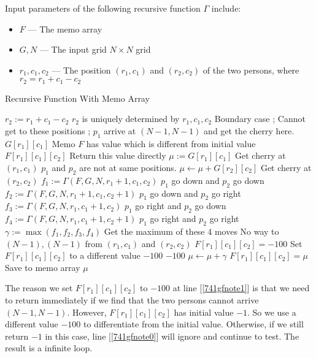 \documentclass[a4paper,12pt]{article}
\begin{document}
Input parameters of the following recursive function $\Gamma$ include:
\begin{itemize}
\item $F$ --- The memo array
\item $G, N$ --- The input grid $N\times N$ grid
\item $r_1, c_1, c_2$ --- The position $(r_1, c_1)$ and $(r_2, c_2)$ of the two persons, where $r_2 = r_1+c_1-c_2$
\end{itemize}
\begin{algorithm}[H]
\caption{Recursive Function With Memo Array}
\label{741gf}
\begin{algorithmic}[1]
\State $r_2 := r_1+c_1-c_2$ \Comment $r_2$ is uniquely determined by $r_1,c_1,c_2$
 \Comment Boundary case
\State {};
\EndIf
{} \Comment Cannot get to these positions
\State {};
\EndIf
{} \Comment $p_1$ arrive at $(N-1, N-1)$ and get the cherry here.
\State \Return $G[r_1][c_1]$
\EndIf
{} \Comment Memo $F$ has value which is different from initial value \label{741gfnote0}
\State \Return $F[r_1][c_1][c_2]$ \Comment  Return this value directly
\EndIf
\State $\mu:=G[r_1][c_1]$ \Comment Get cherry at $(r_1, c_1)$
 \Comment $p_1$ and $p_2$ are not at same positions.
\State $\mu\gets \mu+G[r_2][c_2]$ \Comment Get cherry at $(r_2, c_2)$
\EndIf
\State $f_1 := \Gamma(F, G, N, r_1+1, c_1, c_2)$ \Comment $p_1$ go down  and $p_2$ go down
\State $f_2 := \Gamma(F, G, N, r_1+1, c_1, c_2+1)$ \Comment $p_1$ go down  and $p_2$ go right
\State $f_3 := \Gamma(F, G, N, r_1, c_1+1, c_2)$ \Comment $p_1$ go right  and $p_2$ go down
\State $f_4 := \Gamma(F, G, N, r_1, c_1+1, c_2+1)$ \Comment $p_1$ go right  and $p_2$ go right
\State $\gamma := \max(f_1,f_2,f_3,f_4)$ \Comment Get the maximum of these 4 moves
 \Comment No way to $(N-1), (N-1)$ from $(r_1, c_1)$ and $(r_2, c_2)$
\State $F[r_1][c_1][c_2] = -100$ \Comment Set $F[r_1][c_1][c_2]$ to a different value $-100$ \label{741gfnote1}
\State \Return $-100$
\EndIf
\State $\mu\gets \mu + \gamma$
\State $F[r_1][c_1][c_2] =\mu$ \Comment Save to memo array
\State \Return $\mu$
\EndFunction
\end{algorithmic}
\end{algorithm}
The reason we set $F[r_1][c_1][c_2]$ to $-100$ at line [\ref{741gfnote1}] is that we need to return immediately if we find that the two persons cannot arrive $(N-1, N-1)$. However, $F[r_1][c_1][c_2]$ has initial value $-1$. So we use a different value $-100$ to differentiate from the initial value. Otherwise, if we still return $-1$ in this case, line [\ref{741gfnote0}] will ignore and continue to test. The result is a infinite loop.
\end{document}
